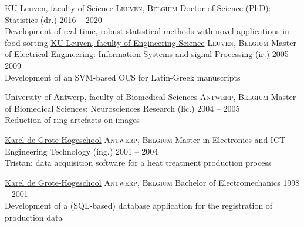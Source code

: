 \documentclass[10pt,a4paper]{article}
\begin{document}
\vspace{+1em} 


\spacedhrule{-0.2em}{-0.4em}
\newpage
{}

\headedsection
  {\href{https://wet.kuleuven.be/english}{KU Leuven, faculty of Science}}
  {\textsc{Leuven, Belgium}} {%
  \headedsubsection
    {Doctor of Science (PhD): Statistics (dr.)}
    {2016 -- 2020}{\\Development of real-time, robust statistical methods with novel applications in food sorting}
}
\vspace{+0.2em}
\headedsection
  {\href{https://eng.kuleuven.be/en}{KU Leuven, faculty of Engineering Science}}
  {\textsc{Leuven, Belgium}} {%
  \headedsubsection
    {Master of Electrical Engineering: Information Systems and signal Processing (ir.)}
    {2005--2009} {\\Development of an SVM-based OCS for Latin-Greek manuscripts}
}

\vspace{+0.2em}
\headedsection
  {\href{https://www.uantwerpen.be/en/}{University of Antwerp, faculty of Biomedical Sciences}}
  {\textsc{Antwerp, Belgium}} {%
  \headedsubsection
    {Master of Biomedical Sciences: Neurosciences Research (lic.)}
    {2004 -- 2005} {\\Reduction of ring artefacts on  images}
}

\vspace{+0.2em}
\headedsection
{\href{https://www.kdg.be/}{Karel de Grote-Hogeschool}}
{\textsc{Antwerp, Belgium}} {%
	\headedsubsection
	{Master in Electronics and ICT Engineering Technology (ing.)}
	{2001 -- 2004} {\\Tristan: data acquisition software for a heat treatment production process}
}

\vspace{+0.2em}
\headedsection
{\href{https://www.kdg.be/}{Karel de Grote-Hogeschool}}
{\textsc{Antwerp, Belgium}} {%
	\headedsubsection
	{Bachelor of Electromechanics}
	{1998 -- 2001} {\\Development of a (SQL-based) database application for the registration of production data}
}
\end{document}
